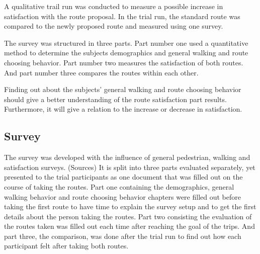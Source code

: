 A qualitative trail run was conducted to measure a possible increase in satisfaction with the route proposal. In the trial run, the standard route was compared to the newly proposed route and measured using one survey. 

The survey was structured in three parts. Part number one used a quantitative method to determine the subjects demographics and general walking and route choosing behavior. Part number two measures the satisfaction of both routes. And part number three compares the routes within each other.

Finding out about the subjects' general walking and route choosing behavior should give a better understanding of the route satisfaction part results. Furthermore, it will give a relation to the increase or decrease in satisfaction.













\subsection{Survey}

The survey was developed with the influence of general pedestrian, walking and satisfaction surveys. (Sources) It is split into three parts evaluated separately, yet presented to the trial participants as one document that was filled out on the course of taking the routes. Part one containing the demographics, general walking behavior and route choosing behavior chapters were filled out before taking the first route to have time to explain the survey setup and to get the first details about the person taking the routes. Part two consisting the evaluation of the routes taken was filled out each time after reaching the goal of the trips. And part three, the comparison, was done after the trial run to find out how each participant felt after taking both routes.

